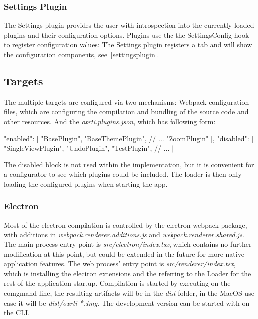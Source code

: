 \subsubsection{Settings Plugin}
The Settings plugin provides the user with introspection into the currently loaded
plugins and their configuration options. Plugins use the the SettingsConfig hook
to register configuration values:
The Settings plugin registers a tab and will show the configuration components,
see~\autoref{settingsplugin}.


\subsection{Targets}\label{sec_apps}
The multiple targets are configured via two mechanisms:
Webpack configuration files, which are configuring the compilation and bundling of the
source code and other resources. And the \emph{oxrti.plugins.json}, which has following form:
\begin{typescript}
{
    "enabled": [
        "BasePlugin",
        "BaseThemePlugin",
        // ...
        "ZoomPlugin"
    ],
    "disabled": [
        "SingleViewPlugin",
        "UndoPlugin",
        "TestPlugin",
        // ...
    ]
}
\end{typescript}
The disabled block is not used within the implementation, but it is convenient
for a configurator to see which plugins could be included. The loader is then
only loading the configured plugins when starting the app.

\subsubsection{Electron}
Most of the electron compilation is controlled by the electron-webpack package,
with additions in \emph{webpack.renderer.additions.js} and
\emph{webpack.renderer.shared.js}. The main process entry point is
\emph{src/electron/index.tsx}, which contains no further modification at this
point, but could be extended in the future for more native application features.
The web process' entry point is \emph{src/renderer/index.tsx}, which is
installing the electron extensions and the referring to the Loader for the rest
of the application startup. Compilation is started by executing  on the comgmand line, the resulting artifacts will be
in the \emph{dist} folder, in the MacOS use case it will be
\emph{dist/oxrti-*.dmg}. The development version can be started with  on the CLI.


